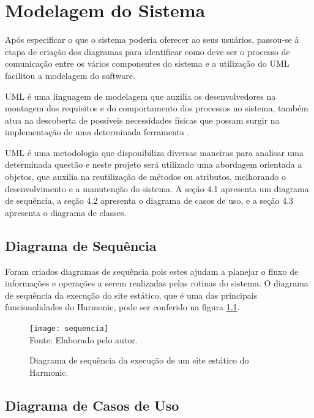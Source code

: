 \documentclass[ppginf, pep]{esinucpel}
\begin{document}
\chapter{Modelagem do Sistema}

Após especificar o que o sistema poderia oferecer ao seus usuários, passou-se à etapa de criação dos diagramas para identificar como deve ser o processo de comunicação entre os vários componentes do sistema e a utilização do UML facilitou a modelagem do software.

UML é uma linguagem de modelagem que auxilia os desenvolvedores na montagem dos requisitos e do comportamento dos processos no sistema, também atua na descoberta de possíveis necessidades físicas que possam surgir na implementação de uma determinada ferramenta \cite{uml}.

UML é uma metodologia que disponibiliza diversas maneiras para analisar uma determinada questão e neste projeto será utilizado uma abordagem orientada a objetos, que auxilia na reutilização de métodos ou atributos, melhorando o desenvolvimento e a manutenção do sistema. A seção 4.1 apresenta um diagrama de sequência, a seção 4.2 apresenta o diagrama de casos de uso, e a seção 4.3 apresenta o diagrama de classes.

\newpage
\section{Diagrama de Sequência}

Foram criados diagramas de sequência pois estes ajudam a planejar o fluxo de informações e operações a serem realizadas pelas rotinas do sistema. O diagrama de sequência da execução do site estático, que é uma das principais funcionalidades do Harmonic, pode ser conferido na figura \ref{fig:sequencia}.

\begin{figure}[H]
    \centering
    \caption{Diagrama de sequência da execução de um site estático do Harmonic.}
    \vspace{5pt}
    \texttt{[image: sequencia]}
    \\Fonte: Elaborado pelo autor.
    \label{fig:sequencia}
\end{figure}

\newpage
\section{Diagrama de Casos de Uso}
\end{document}

